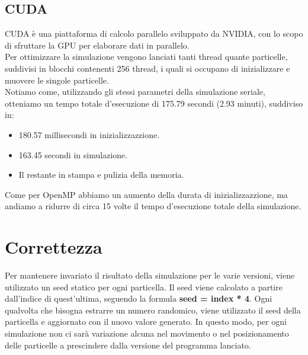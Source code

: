 \documentclass{article}
\begin{document}
\subsection{CUDA}
CUDA è una piattaforma di calcolo parallelo sviluppato da NVIDIA, con lo scopo di sfruttare la GPU per elaborare dati in parallelo.\\
Per ottimizzare la simulazione vengono lanciati tanti thread quante particelle, suddivisi in blocchi contenenti 256 thread, i quali si occupano di inizializzare e muovere le singole particelle.\\
Notiamo come, utilizzando gli stessi parametri della simulazione seriale, otteniamo un tempo totale d'esecuzione di 175.79 secondi (2.93 minuti), suddiviso in:
\begin{itemize}
    \item 180.57 millisecondi in inizializzazzione.
    \item 163.45 secondi in simulazione.
    \item Il restante in stampa e pulizia della memoria.
\end{itemize}
Come per OpenMP abbiamo un aumento della durata di inizializzazzione, ma andiamo a ridurre di circa 15 volte il tempo d'esecuzione totale della simulazione.

\section{Correttezza}
Per mantenere invariato il risultato della simulazione per le varie versioni, viene utilizzato un seed statico per ogni particella. Il seed viene calcolato a partire dall'indice
di quest'ultima, seguendo la formula \textbf{seed = index * 4}. Ogni qualvolta che bisogna estrarre un numero randomico, viene utilizzato il seed della particella e aggiornato con il nuovo valore generato.
In questo modo, per ogni simulazione non ci sarà variazione alcuna nel movimento o nel posizionamento delle particelle a prescindere dalla versione del programma lanciato.
\end{document}
